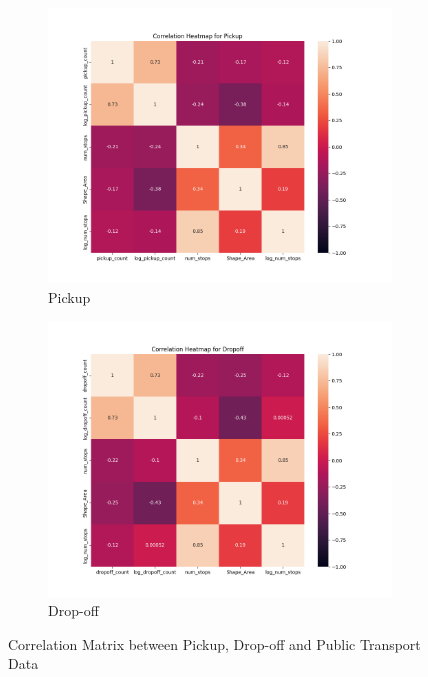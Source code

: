 \documentclass[11pt]{article}
\begin{document}
\begin{figure}[h]
    \begin{subfigure}{0.48\textwidth}
        \includegraphics[width=\linewidth]{correlation_matrix_pickup.png} 
        \caption{Pickup}
        \label{fig:corr_pickup}
    \end{subfigure}
    \begin{subfigure}{0.48\textwidth}
        \includegraphics[width=\linewidth]{correlation_matrix_dropoff.png}
        \caption{Drop-off}
        \label{fig:corr_dropoff}
    \end{subfigure}
\caption{Correlation Matrix between Pickup, Drop-off and Public Transport Data}
\label{fig:corr_matrix}
\end{figure}
\end{document}
